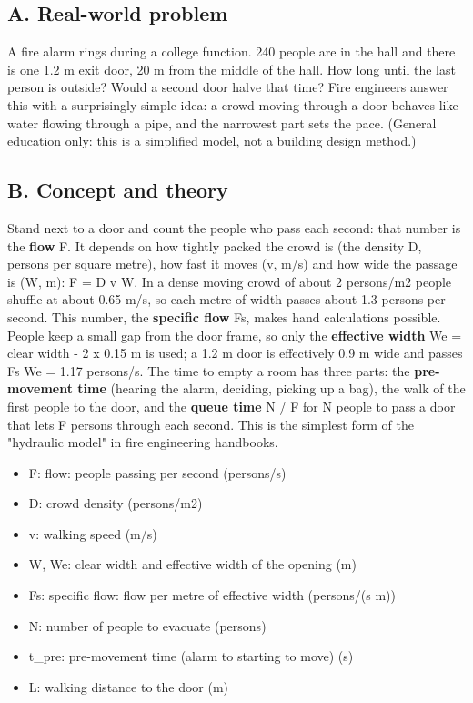\documentclass[11pt,a4paper]{article}
\begin{document}
\subsection*{A. Real-world problem}
A fire alarm rings during a college function. 240 people are in the hall and there is one 1.2 m exit door, 20 m from the middle of the hall. How long until the last person is outside? Would a second door halve that time? Fire engineers answer this with a surprisingly simple idea: a crowd moving through a door behaves like water flowing through a pipe, and the narrowest part sets the pace. (General education only: this is a simplified model, not a building design method.)

\subsection*{B. Concept and theory}
Stand next to a door and count the people who pass each second: that number is the \textbf{flow} F. It depends on how tightly packed the crowd is (the density D, persons per square metre), how fast it moves (v, m/s) and how wide the passage is (W, m): F = D v W. In a dense moving crowd of about 2 persons/m2 people shuffle at about 0.65 m/s, so each metre of width passes about 1.3 persons per second. This number, the \textbf{specific flow} Fs, makes hand calculations possible. People keep a small gap from the door frame, so only the \textbf{effective width} We = clear width - 2 x 0.15 m is used; a 1.2 m door is effectively 0.9 m wide and passes Fs We = 1.17 persons/s. The time to empty a room has three parts: the \textbf{pre-movement time} (hearing the alarm, deciding, picking up a bag), the walk of the first people to the door, and the \textbf{queue time} N / F for N people to pass a door that lets F persons through each second. This is the simplest form of the "hydraulic model" in fire engineering handbooks.

\begin{itemize}[nosep]
\item F: flow: people passing per second (persons/s)
\item D: crowd density (persons/m2)
\item v: walking speed (m/s)
\item W, We: clear width and effective width of the opening (m)
\item Fs: specific flow: flow per metre of effective width (persons/(s m))
\item N: number of people to evacuate (persons)
\item t\_pre: pre-movement time (alarm to starting to move) (s)
\item L: walking distance to the door (m)
\end{itemize}
\end{document}
